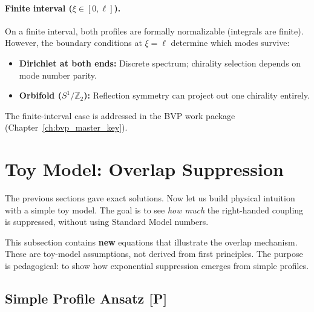 \paragraph{Finite interval ($\xi \in [0, \ell]$).}
On a finite interval, both profiles are formally normalizable (integrals are finite).
However, the boundary conditions at $\xi = \ell$ determine which modes survive:
\begin{itemize}[nosep]
    \item \textbf{Dirichlet at both ends:} Discrete spectrum; chirality selection
          depends on mode number parity.
    \item \textbf{Orbifold ($S^1/\mathbb{Z}_2$):} Reflection symmetry can project
          out one chirality entirely.
\end{itemize}
The finite-interval case is addressed in the BVP work package (Chapter~\ref{ch:bvp_master_key}).

\begin{center}
\end{center}

\section{Toy Model: Overlap Suppression}
\label{sec:ch9_toy_model}

The previous sections gave exact solutions. Now let us build physical intuition
with a simple toy model. The goal is to see \emph{how much} the right-handed
coupling is suppressed, without using Standard Model numbers.

\begin{tcolorbox}[colback=gray!5, colframe=gray!50!black,
    title=\textbf{Toy Model Disclaimer}]
This subsection contains \textbf{new} equations that illustrate the overlap
mechanism. These are \tagP{} toy-model assumptions, not derived from first
principles. The purpose is pedagogical: to show how exponential suppression
emerges from simple profiles.
\end{tcolorbox}

\subsection{Simple Profile Ansatz [P]}

